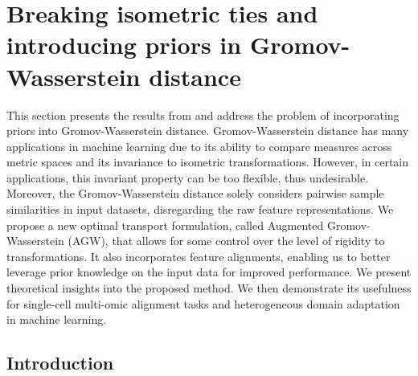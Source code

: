 
\chapter[Breaking isometric ties and introducing priors in Gromov-Wasserstein distance]{Breaking isometric ties and introducing priors in Gromov-Wasserstein distance}
\label{chap:agw}

\renewcommand{\contentsname}{Contents}
\localtableofcontents*
{}

\hfill \break
This section presents the results from \citep{Demetci23} and address the problem of
incorporating priors into Gromov-Wasserstein distance.
Gromov-Wasserstein distance has many applications in machine learning due to its ability
to compare measures across metric spaces and its invariance to isometric transformations. However,
in certain applications, this invariant property can be too flexible, thus undesirable. Moreover,
the Gromov-Wasserstein distance solely considers pairwise sample similarities in input datasets,
disregarding the raw feature representations. We propose a new optimal transport formulation,
called Augmented Gromov-Wasserstein (AGW), that allows for some control over the
level of rigidity to transformations. It also incorporates feature alignments,
enabling us to better leverage prior knowledge on the input data for improved performance.
We present theoretical insights into the proposed method. We then demonstrate its usefulness
for single-cell multi-omic alignment tasks and heterogeneous domain adaptation in machine learning.


\raggedbottom

\section{Introduction}


